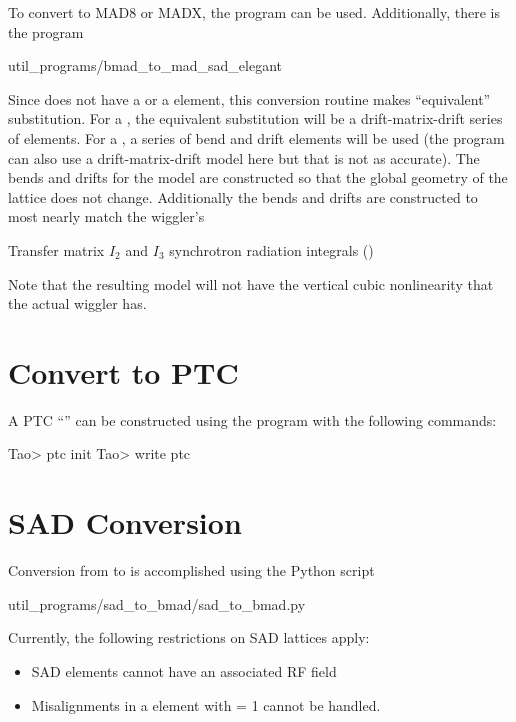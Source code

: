 To convert to MAD8 or MADX, the \tao program can be used. Additionally, there is the program
\begin{example}
  util_programs/bmad_to_mad_sad_elegant
\end{example}
Since \mad does not have a  or a
 element, this conversion routine makes ``equivalent'' substitution. For a
, the equivalent substitution will be a drift-matrix-drift series of elements. For a
, a series of bend and drift elements will be used (the program can also use a
drift-matrix-drift model here but that is not as accurate). The bends and drifts for the
 model are constructed so that the global geometry of the lattice does not
change. Additionally the bends and drifts are constructed to most nearly match the wiggler's
\begin{example}
  Transfer matrix
  $I_2$ and $I_3$ synchrotron radiation integrals ()
\end{example}
Note that the resulting model will not have the vertical cubic nonlinearity that the actual wiggler
has.

\section{Convert to PTC}
\label{s:to.ptc}

A PTC ``'' can be constructed using the \tao program with the following commands:
\begin{example}
  Tao> ptc init
  Tao> write ptc
\end{example}

\section{SAD Conversion}
\label{s:sad.convert}

Conversion from \cite{b:sad} to \bmad is accomplished using the Python script
\begin{example}
  util_programs/sad_to_bmad/sad_to_bmad.py
\end{example}
Currently, the following restrictions on SAD lattices apply:
  \begin{itemize}
  \item
SAD  elements cannot have an associated RF field
  \item
Misalignments in a  element with  = 1 cannot be handled.
  \end{itemize}

